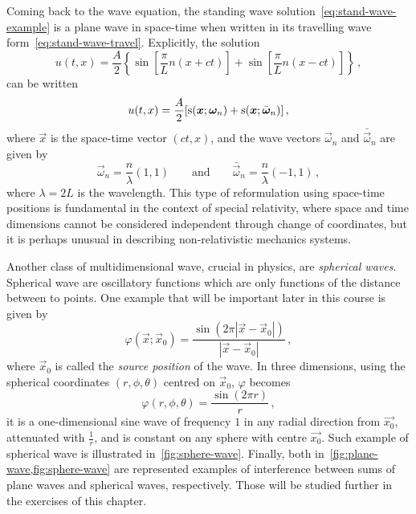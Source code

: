 Coming back to the wave equation, the standing wave solution~\cref{eq:stand-wave-example}
is a plane wave in space-time when written in its travelling wave
form~\cref{eq:stand-wave-travel}. Explicitly, the solution
\begin{equation}
  u(t,x)=\frac{A}{2}\left\{\sin\left[\frac{\pi}{L}n(x+ct)\right]
  +\sin\left[\frac{\pi}{L}n(x-ct)\right]\right\}\,,
\end{equation}
can be written
\begin{equation}
  u(t,x)=\frac{A}{2}[\operatorname{s}(\bm{x};\bm{\omega}_n)+\operatorname{s}(\bm{x};\bar{\bm{\omega}}_n)]\,,
\end{equation}
where $\vec{x}$ is the space-time vector $(ct,x)$, and the wave vectors $\vec{\omega}_n$
and $\bar{\vec{\omega}}_n$ are given by
\begin{equation}
  \vec{\omega}_n=\frac{n}{\lambda}(1,1)\qquad\text{and}\qquad
  \bar{\vec{\omega}}_n=\frac{n}{\lambda}(-1,1)\,,
\end{equation}
where $\lambda=2L$ is the wavelength. This type of reformulation using space-time
positions is fundamental in the context of special relativity, where space and time
dimensions cannot be considered independent through change of coordinates, but it is
perhaps unusual in describing non-relativistic mechanics systems.

Another class of multidimensional wave, crucial in physics, are \emph{spherical waves}.
Spherical wave are oscillatory functions which are only functions of the distance between
to points. One example that will be important later in this course is given by
\begin{equation}
  \label{eq:sphere-wave}
  \varphi(\vec{x};\vec{x}_0)=\frac{\sin(2\pi|\vec{x}-\vec{x}_0|)}{|\vec{x}-\vec{x}_0|}\,,
\end{equation}
where $\vec{x}_0$ is called the \emph{source position} of the wave. In three dimensions,
using the spherical coordinates $(r,\phi,\theta)$ centred on $\vec{x}_0$, $\varphi$
becomes
\begin{equation}
  \varphi(r,\phi,\theta)=\frac{\sin(2\pi r)}{r}\,,
\end{equation}
\ie it is a one-dimensional sine wave of frequency $1$ in any radial direction from
$\vec{x_0}$, attenuated with $\frac{1}{r}$, and is constant on any sphere with centre
$\vec{x_0}$. Such example of spherical wave is illustrated in~\cref{fig:sphere-wave}.
Finally, both in~\cref{fig:plane-wave,fig:sphere-wave} are represented examples of
interference between sums of plane waves and spherical waves, respectively. Those will be
studied further in the exercises of this chapter.

